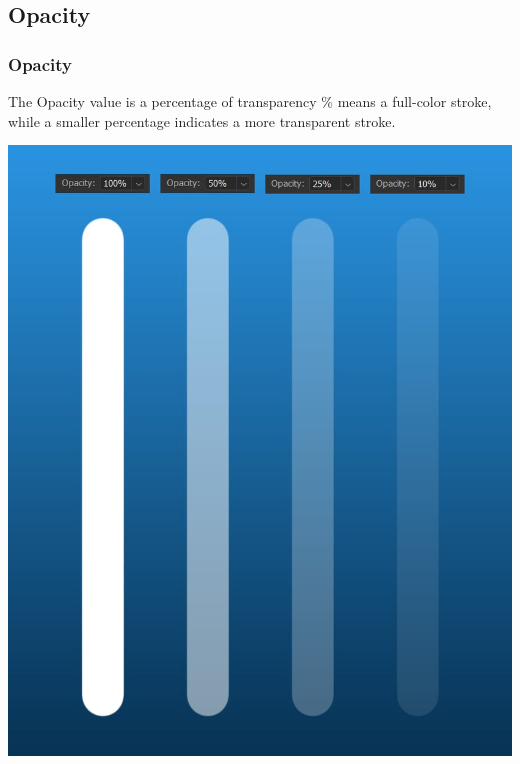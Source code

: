 \documentclass{beamer}
\begin{document}
\subsection{Opacity}	
\begin{frame}
	\frametitle{Opacity}
	\begin{outline}
		\1 The Opacity value is a percentage of transparency 
		\% means a full-color stroke, while a smaller percentage indicates a more transparent stroke.
	\end{outline}
	\begin{center}
		\includegraphics[width = 1.0\textwidth]{images/2.6.jpg}
	\end{center}
\end{frame}
\end{document}

